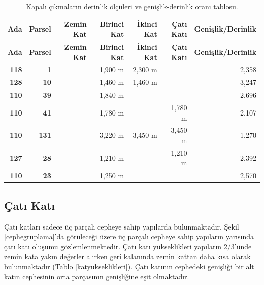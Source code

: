 \documentclass[12pt,turkish,a4paperpaper,]{report}
\begin{document}
\begin{longtable}[]{@{}rrrrrrr@{}}
\caption{Kapalı çıkmaların derinlik ölçüleri ve genişlik-derinlik oranı
tablosu. \label{CumbaOran}}\tabularnewline
\toprule
\textbf{Ada} & \textbf{Parsel} & \textbf{Zemin Kat} & \textbf{Birinci
Kat} & \textbf{İkinci Kat} & \textbf{Çatı Katı} &
\textbf{Genişlik/Derinlik}\tabularnewline
\midrule
\endfirsthead
\toprule
\textbf{Ada} & \textbf{Parsel} & \textbf{Zemin Kat} & \textbf{Birinci
Kat} & \textbf{İkinci Kat} & \textbf{Çatı Katı} &
\textbf{Genişlik/Derinlik}\tabularnewline
\midrule
\endhead
\textbf{118} & \textbf{1} & & 1,900 m & 2,300 m & & 2,358\tabularnewline
\textbf{128} & \textbf{10} & & 1,460 m & 1,460 m & &
3,247\tabularnewline
\textbf{110} & \textbf{39} & & 1,840 m & & & 2,696\tabularnewline
\textbf{110} & \textbf{41} & & 1,780 m & & 1,780 m &
2,107\tabularnewline
\textbf{110} & \textbf{131} & & 3,220 m & 3,450 m & 3,450 m &
1,270\tabularnewline
\textbf{127} & \textbf{28} & & 1,210 m & & 1,210 m &
2,392\tabularnewline
\textbf{110} & \textbf{23} & & 1,250 m & & & 2,570\tabularnewline
\bottomrule
\end{longtable}

\newpage

\hypertarget{uxe7atux131-katux131}{%
\subsection{Çatı Katı}\label{uxe7atux131-katux131}}

Çatı katları sadece üç parçalı cepheye sahip yapılarda bulunmaktadır.
Şekil \ref{cephegruplama}'da görüleceği üzere üç parçalı cepheye sahip
yapıların yarısında çatı katı oluşumu gözlemlenmektedir. Çatı katı
yükseklikleri yapıların 2/3'ünde zemin kata yakın değerler alırken geri
kalanında zemin kattan daha kısa olarak bulunmaktadır (Tablo
\ref{katyukseklikleri}). Çatı katının cephedeki genişliği bir alt katın
cephesinin orta parçasının genişliğine eşit olmaktadır.
\end{document}
